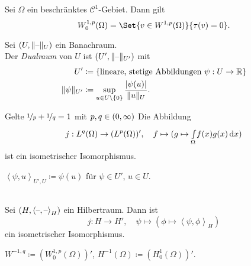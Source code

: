 \documentclass{cheat-sheet}
\newcommand{\Cont}{\mathcal{C}} %
\newcommand{\scp}[2]{\left\langle #1 , #2 \right\rangle} %
\begin{document}
\begin{satz}
  Sei $\Omega$ ein beschränktes $\Cont^1$-Gebiet.
  Dann gilt
  \[
    W_0^{1,p}(\Omega) = \Set{v \in W^{1,p}(\Omega)}{\tau(v) = 0}.
  \]
\end{satz}



\begin{defn}
  Sei $(U, \lVert\text{--}\rVert_U)$ ein Banachraum. \\
  Der \emph{Dualraum} von $U$ ist $(U', \lVert\text{--}\rVert_{U'})$ mit
  \begin{align*}
    U' & \coloneqq \{ \text{lineare, stetige Abbildungen } \psi : U \to \mathbb{R} \} \\
    \lVert\psi\rVert_{U'} & \coloneqq \sup_{u \in U \setminus \{ 0 \}} \frac{\lvert\psi(u)\rvert}{\lVert u\rVert_U}.
  \end{align*}
\end{defn}

\begin{bsp}
  Gelte $\nicefrac{1}{p} + \nicefrac{1}{q} = 1$ mit $p, q \in \left( 0, \infty \right)$ Die Abbildung
  \[
    j : L^q(\Omega) \to (L^p(\Omega))', \quad
    f \mapsto (g \mapsto {\textstyle \int\limits_{\Omega}^{}} f(x) g(x) \,\mathrm{d} x)
  \]
  ist ein isometrischer Isomorphismus.
\end{bsp}

\begin{nota}
  $\scp{\psi}{u}_{U', U} \coloneqq \psi(u)$ für $\psi \in U'$, $u \in U$.
\end{nota}

\begin{satz} \mbox{} \\
  Sei $(H, \scp{\blank}{\blank}_H)$ ein Hilbertraum.
  Dann ist 
  \[
    j : H \to H', \quad
    \psi \mapsto (\phi \mapsto \scp{\psi}{\phi}_H)
  \]
  ein isometrischer Isomorphismus.
\end{satz}

\begin{defn}
  $W^{-1,q} \coloneqq (W_0^{1,p}(\Omega))'$, \quad
  $H^{-1}(\Omega) \coloneqq (H_0^1(\Omega))'$.
\end{defn}

\end{document}
